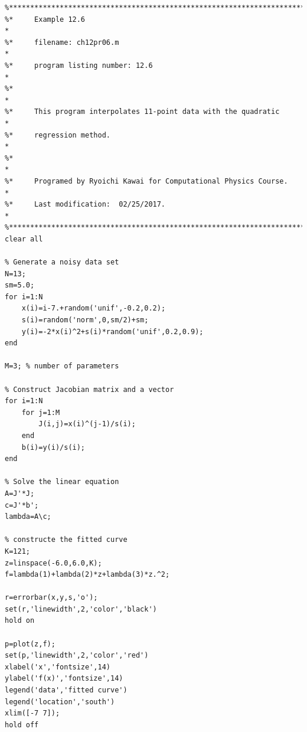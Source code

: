 \bigskip
\noindent
\program
\label{prog:quadratic_regression}
\footnotesize
\begin{verbatim}
%**************************************************************************
%*     Example 12.6                                                       *
%*     filename: ch12pr06.m                                               *
%*     program listing number: 12.6                                       *
%*                                                                        *
%*     This program interpolates 11-point data with the quadratic         *
%*     regression method.                                                 *
%*                                                                        *
%*     Programed by Ryoichi Kawai for Computational Physics Course.       *
%*     Last modification:  02/25/2017.                                    *
%**************************************************************************
clear all

% Generate a noisy data set
N=13;
sm=5.0;
for i=1:N
    x(i)=i-7.+random('unif',-0.2,0.2);
    s(i)=random('norm',0,sm/2)+sm;
    y(i)=-2*x(i)^2+s(i)*random('unif',0.2,0.9);
end

M=3; % number of parameters

% Construct Jacobian matrix and a vector
for i=1:N
    for j=1:M
        J(i,j)=x(i)^(j-1)/s(i);
    end
    b(i)=y(i)/s(i);
end

% Solve the linear equation
A=J'*J;
c=J'*b';
lambda=A\c;

% constructe the fitted curve
K=121;
z=linspace(-6.0,6.0,K);
f=lambda(1)+lambda(2)*z+lambda(3)*z.^2;

r=errorbar(x,y,s,'o');
set(r,'linewidth',2,'color','black')
hold on

p=plot(z,f);
set(p,'linewidth',2,'color','red')
xlabel('x','fontsize',14)
ylabel('f(x)','fontsize',14)
legend('data','fitted curve')
legend('location','south')
xlim([-7 7]);
hold off
\end{verbatim}
\normalsize

